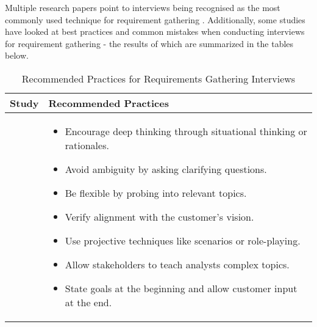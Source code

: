Multiple research papers point to interviews being recognised as the most commonly used technique for requirement gathering \parencite{interviews5,interviews1,interviews2}. Additionally, some studies have looked at best practices and common mistakes when conducting interviews for requirement gathering - the results of which are summarized in the tables below.
\begin{table}[h!]
    \centering
    \small
    \begin{tabular}{|p{}|p{}|}
    \hline
    \textbf{Study} & \textbf{Recommended Practices} \\ \hline
    
    \textcite{interviews4, interviews3} & 
    \begin{itemize}
        \item Encourage deep thinking through situational thinking or rationales.
        \item Avoid ambiguity by asking clarifying questions.
        \item Be flexible by probing into relevant topics.
        \item Verify alignment with the customer's vision.
        \item Use projective techniques like scenarios or role-playing.
        \item Allow stakeholders to teach analysts complex topics.
        \item State goals at the beginning and allow customer input at the end.
    \end{itemize} \\ \hline
    
    \end{tabular}
    \label{tab:recommended_practices}
    \caption{Recommended Practices for Requirements Gathering Interviews}
\end{table}
    
